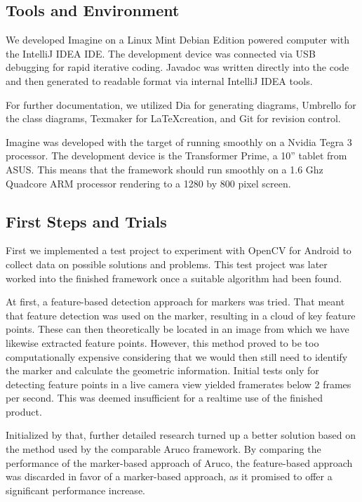 \subsection{Tools and Environment}

We developed Imagine on a Linux Mint Debian Edition powered computer with the IntelliJ IDEA IDE\cite{idea}.
The development device was connected via USB debugging for rapid iterative coding.
Javadoc was written directly into the code and then generated to readable format via internal IntelliJ IDEA tools.

For further documentation, we utilized Dia\cite{dia} for generating diagrams, Umbrello\cite{umbrello} for the class diagrams, Texmaker\cite{texmaker} for \LaTeX  creation, and Git\cite{git} for revision control.

Imagine was developed with the target of running smoothly on a Nvidia Tegra 3 processor.
The development device is the Transformer Prime, a 10'' tablet from ASUS\cite{devicedev}.
This means that the framework should run smoothly on a 1.6 Ghz Quadcore ARM processor rendering to a 1280 by 800 pixel screen.

\subsection{First Steps and Trials}

First we implemented a test project to experiment with OpenCV for Android to collect data on possible solutions and problems.
This test project was later worked into the finished framework once a suitable algorithm had been found.

At first, a feature-based detection approach for markers was tried.
That meant that feature detection was used on the marker, resulting in a cloud of key feature points.
These can then theoretically be located in an image from which we have likewise extracted feature points.
However, this method proved to be too computationally expensive considering that we would then still need to identify the marker and calculate the geometric information.
Initial tests only for detecting feature points in a live camera view yielded framerates below 2 frames per second.
This was deemed insufficient for a realtime use of the finished product.

Initialized by that, further detailed research turned up a better solution based on the method used by the comparable Aruco\cite{aruco} framework.
By comparing the performance of the marker-based approach of Aruco, the feature-based approach was discarded in favor of a marker-based approach, as it promised to offer a significant performance increase.

